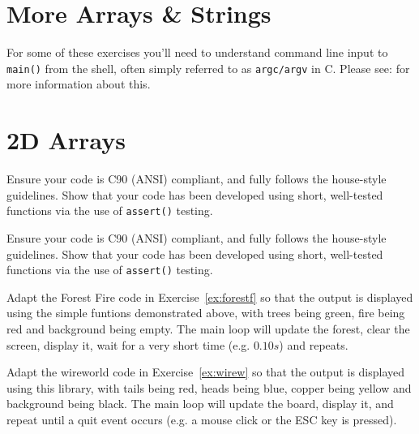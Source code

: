 





\chapter{More Arrays \& Strings}

For some of these exercises you'll need to understand command line input to
\verb^main()^ from the shell, often simply referred to as \verb^argc/argv^ in C.
Please see:
for more information about this.







\chapter{2D Arrays}







\noindent Ensure your code is C90 (ANSI) compliant, and fully follows the house-style guidelines.
Show that your code has been developed using short, well-tested functions via the use of \verb^assert()^ testing.



\noindent Ensure your code is C90 (ANSI) compliant, and fully follows the house-style guidelines.
Show that your code has been developed using short, well-tested functions via the use of \verb^assert()^ testing.





%



\begin{exercise}
Adapt the Forest Fire code in Exercise~\ref{ex:forestf} so that the output
is displayed using the simple funtions demonstrated above, with trees being green, fire being red and
background being empty.  The main loop will
update the forest, clear the screen, display it, wait for a very short time (e.g. $0.10s$) and repeats.
\end{exercise}



\begin{exercise}
Adapt the wireworld code in Exercise~\ref{ex:wirew} so that the output
is displayed using this library, with tails being red, heads being blue,
copper being yellow and background being black.  The main loop will
update the board, display it, and repeat until a quit event occurs
(e.g. a mouse click or the ESC key is pressed).  \end{exercise}

